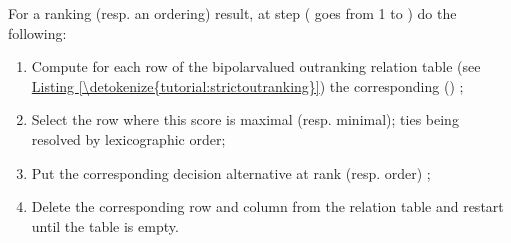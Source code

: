 \documentclass[a4paper,12pt,english]{sphinxhowto}
\begin{document}
For a ranking (resp. an ordering) result, at step  ( goes from 1 to ) do the following:
\begin{enumerate}
%
\item {} 
Compute for each row of the bipolar\sphinxhyphen{}valued outranking relation table (see \hyperref[\detokenize{tutorial:strictoutranking}]{Listing \ref{\detokenize{tutorial:strictoutranking}}}) the corresponding {\hyperref[\detokenize{tutorial:netflows-ranking-label}]{}} () ;

\item {} 
Select the row where this score is maximal (resp. minimal); ties being resolved by lexicographic order;

\item {} 
Put the corresponding decision alternative at rank (resp. order) ;

\item {} 
Delete the corresponding row and column from the relation table and restart until the table is empty.

\end{enumerate}
\end{document}
